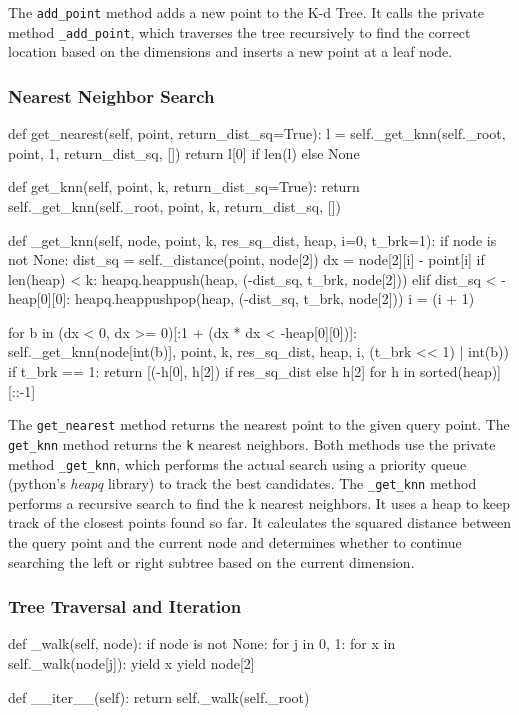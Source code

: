 \documentclass{article}
\begin{document}
	The \texttt{add\_point} method adds a new point to the K-d Tree. It calls the private method \texttt{\_add\_point}, which traverses the tree recursively to find the correct location based on the dimensions and inserts a new point at a leaf node.
	
	\subsubsection{Nearest Neighbor Search}
	\begin{python}
def get_nearest(self, point, return_dist_sq=True):
	l = self._get_knn(self._root, point, 1, return_dist_sq, [])
	return l[0] if len(l) else None
		
def get_knn(self, point, k, return_dist_sq=True):
	return self._get_knn(self._root, point, k, return_dist_sq, [])
	
def _get_knn(self, node, point, k, res_sq_dist, heap, i=0, t_brk=1):
	if node is not None:
		dist_sq = self._distance(point, node[2])
		dx = node[2][i] - point[i]
		if len(heap) < k:
			heapq.heappush(heap, (-dist_sq, t_brk, node[2]))
		elif dist_sq < -heap[0][0]:
			heapq.heappushpop(heap, (-dist_sq, t_brk, node[2]))
		i = (i + 1) %
		
		for b in (dx < 0, dx >= 0)[:1 + (dx * dx < -heap[0][0])]:
			self._get_knn(node[int(b)], point, k, res_sq_dist, heap, i, (t_brk << 1) | int(b))
		if t_brk == 1:
			return [(-h[0], h[2]) if res_sq_dist else h[2] for h in sorted(heap)][::-1]
	\end{python}


	The \texttt{get\_nearest} method returns the nearest point to the given query point. The \texttt{get\_knn} method returns the \texttt{k} nearest neighbors. Both methods use the private method \texttt{\_get\_knn}, which performs the actual search using a priority queue (python's \textit{heapq} library) to track the best candidates. The \texttt{\_get\_knn} method performs a recursive search to find the k nearest neighbors. It uses a heap to keep track of the closest points found so far. It calculates the squared distance between the query point and the current node and determines whether to continue searching the left or right subtree based on the current dimension.

	
	\subsubsection{Tree Traversal and Iteration}
	\begin{python}
def _walk(self, node):
	if node is not None:
		for j in 0, 1:
			for x in self._walk(node[j]):
				yield x
		yield node[2]
		
def __iter__(self):
	return self._walk(self._root)
	\end{python}
	
\end{document}
